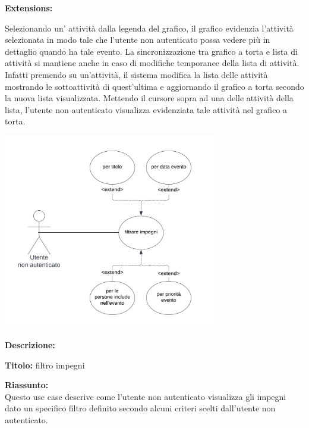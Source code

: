 \begin{listaPersonale}[UC]{}
    \textbf{Extensions:}
    \begin{enumerate}[label=\textbf{[extension \arabic{enumii}]}, ref= \textbf{[extension \arabic{enumii}]}]
         Selezionando un' attività dalla legenda del grafico, il grafico evidenzia l'attività selezionata in modo tale che l'utente non autenticato possa vedere più in dettaglio quando ha tale evento.
         La sincronizzazione tra grafico a torta e lista di attività si mantiene anche in caso di modifiche temporanee della lista di attività. Infatti premendo su un'attività, il sistema modifica la lista delle attività mostrando le sottoattività di quest'ultima e aggiornando il grafico a torta secondo la nuova lista visualizzata.
         Mettendo il cursore sopra ad una delle attività della lista, l'utente non autenticato visualizza evidenziata tale attività nel grafico a torta.
    \end{enumerate}



    \newpage


    \begin{center}
        \includegraphics[width=0.7\textwidth]{img/Diagrammi/UseCases/Filtro.png}
    \end{center}

    \textbf{Descrizione:}

    \textbf{Titolo:} filtro impegni

    \textbf{Riassunto:} \\
    Questo use case descrive come l'utente non autenticato visualizza gli impegni dato un specifico filtro definito secondo alcuni criteri scelti dall'utente non autenticato.


\end{listaPersonale}
